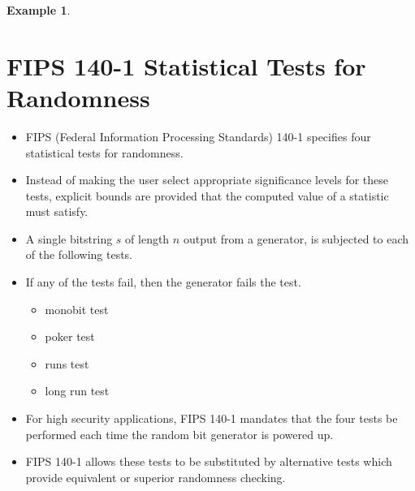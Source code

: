\documentclass[12pt,openany]{book}
\theoremstyle{definition}
\newtheorem{example}{Example}[chapter]
\begin{document}
\begin{example}
	\section{FIPS 140-1 Statistical Tests for Randomness}
	\begin{itemize}
		\item FIPS (Federal Information Processing Standards) 140-1 specifies four statistical tests for randomness.
		\item Instead of making the user select appropriate significance levels for these tests, explicit bounds are provided that the computed value of a statistic must satisfy.
		\item A single bitstring \( s \) of length \( n \) output from a generator, is subjected to each of the following tests.
		\item If any of the tests fail, then the generator fails the test.
		\begin{itemize}
			\item monobit test
			\item poker test
			\item runs test
			\item long run test
		\end{itemize}
		\item For high security applications, FIPS 140-1 mandates that the four tests be performed each time the random bit generator is powered up.
		\item FIPS 140-1 allows these tests to be substituted by alternative tests which provide equivalent or superior randomness checking.
	\end{itemize}
	

\end{example}
\end{document}
